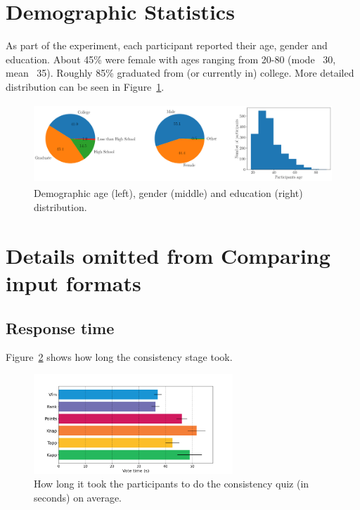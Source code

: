 \documentclass[runningheads]{llncs}
\begin{document}
\section{Demographic Statistics}
As part of the experiment, each participant reported their age, gender and education. About 45\% were female with ages ranging from 20-80 (mode ~30, mean ~35). Roughly 85\% graduated from (or currently in) college. More detailed distribution can be seen in Figure~\ref{fig:distribution}.


\begin{figure}[!h]
\begin{center}
\includegraphics[width=13cm,height=3cm]{experiment/dists.png}
\caption{Demographic age (left), gender (middle) and education (right) distribution.
}\label{fig:distribution}
\end{center}
\end{figure}




\section{Details omitted from Comparing input formats}
\subsection{Response time}
Figure~\ref{fig:consistency_time} shows how long the consistency stage took. 

\begin{figure}[!h]
\begin{center}
\includegraphics[width=7.5cm]{experiment/consistency_time.png}
\caption{How long it took the participants to do the consistency quiz (in seconds) on average.
}\label{fig:consistency_time}
\end{center}
\end{figure}
\end{document}
